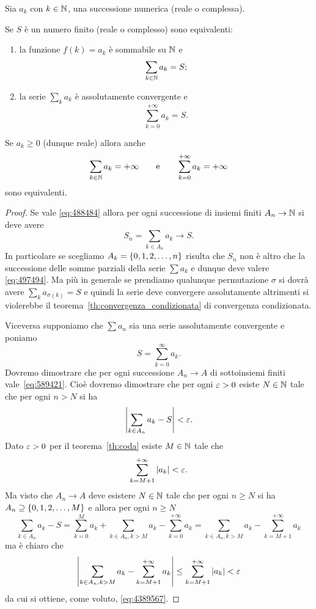 \begin{theorem}
Sia $a_k$ con $k\in \mathbb N$, una successione numerica (reale o complessa).

Se $S$ è un numero finito (reale o complesso)
sono equivalenti:
\begin{enumerate}
  \item la funzione $f(k)=a_k$ è sommabile su $\mathbb N$ e
\begin{equation}\label{eq:488484}
  \sum_{k\in \mathbb N} a_k = S;
\end{equation}
\item la serie $\sum_k a_k$ è assolutamente
convergente e
\begin{equation}\label{eq:497494}
  \sum_{k=0}^{+\infty} a_k = S.
\end{equation}
\end{enumerate}

Se $a_k\ge 0$ (dunque reale) allora anche
\[
  \sum_{k\in \mathbb N} a_k = +\infty
\qquad
\text{e}
\qquad
\sum_{k=0}^{+\infty} a_k = +\infty
\]
sono equivalenti.
\end{theorem}
%
\begin{proof}
  Se vale \eqref{eq:488484} allora per ogni successione
  di insiemi finiti $A_n \to \mathbb N$ si deve avere
  \[
    S_n = \sum_{k\in A_n} a_k  \to S.
  \]
  In particolare se scegliamo $A_k={\left\{ 0,1,2, \dots, n \right\}}$
  risulta che $S_n$ non è altro che la successione delle somme parziali della serie $\sum a_k$ 
  e dunque deve valere \eqref{eq:497494}.
  Ma più in generale se prendiamo qualunque permutazione $\sigma$
  si dovrà avere $\sum_k a_{\sigma(k)} = S$
  e quindi la serie deve convergere assolutamente altrimenti 
  si violerebbe il teorema~\ref{th:convergenza_condizionata} 
  di convergenza condizionata.

  Viceversa supponiamo che $\sum a_n$ sia una serie assolutamente convergente e poniamo
  \[
    S = \sum_{k=0}^{\infty} a_k.
  \]
  Dovremo dimostrare che per ogni successione
  $A_n\to A$ di sottoinsiemi finiti vale~\eqref{eq:589421}.
  Cioè dovremo dimostrare che per ogni $\varepsilon>0$
  esiste $N\in \mathbb N$ tale che per ogni $n>N$ si ha
  \begin{equation}\label{eq:4389567}
    {\left|\sum_{k\in A_n} a_k - S\right|} < \varepsilon.
  \end{equation}
  Dato $\varepsilon>0$ per il teorema~\ref{th:coda} esiste $M\in \mathbb N$
  tale che
  \[
    \sum_{k=M+1}^{+\infty} {\left|a_k\right|} < \varepsilon.
  \]
  Ma visto che $A_n \to A$ deve esistere $N\in \mathbb N$
  tale che per ogni $n\ge N$ si ha $A_n \supseteq {\left\{ 0,1,2,\dots ,M \right\}}$
  e allora per ogni $n\ge N$
  \[
    \sum_{k \in A_n} a_k - S = \sum_{k=0}^M a_k + \sum_{k\in A_n, k>M} a_k - \sum_{k=0}^{+\infty} a_k
    = \sum_{k\in A_n, k>M} a_k - \sum_{k=M+1}^{+\infty} a_k
  \]
  ma è chiaro che
  \[
    {\left|\sum_{k\in A_n, k>M} a_k - \sum_{k=M+1}^{+\infty} a_k\right|}
    \le \sum_{k=M+1}^{+\infty} {\left|a_k\right|} < \varepsilon
  \]
  da cui si ottiene, come voluto, \eqref{eq:4389567}.
\end{proof}

